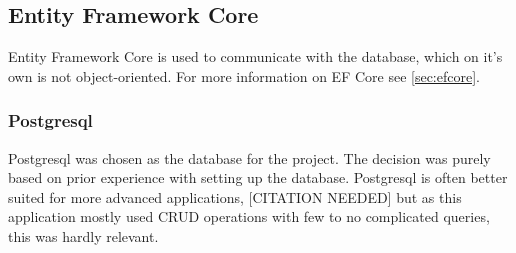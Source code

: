 \subsection{Entity Framework Core}
Entity Framework Core is used to communicate with the database, which on it's own is not object-oriented.
For more information on EF Core see \cref{sec:efcore}.
\subsubsection{Postgresql}
Postgresql was chosen as the database for the project.
The decision was purely based on prior experience with setting up the database.
Postgresql is often better suited for more advanced applications, [CITATION NEEDED] but as this application mostly used CRUD operations with few to no complicated queries, this was hardly relevant.

